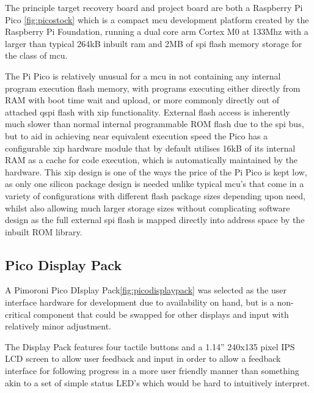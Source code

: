 The principle target recovery board and project board are both a Raspberry Pi Pico \autoref{fig:picostock} which is a compact \gls{mcu} development platform created by the Raspberry Pi Foundation, running a dual core \gls{arm} Cortex M0 at 133Mhz with a larger than typical 264kB inbuilt \gls{ram} and 2MB of \gls{spi} flash memory storage for the class of \gls{mcu}\cite{ltdBuyRaspberryPi}.

The Pi Pico is relatively unusual for a \gls{mcu} in not containing any internal program execution flash memory, with programs executing either directly from RAM with boot time wait and upload, or more commonly directly out of attached \gls{qspi} flash with \gls{xip} functionality. External flash access is inherently much slower than normal internal programmable ROM flash due to the \gls{spi} bus, but to aid in achieving near equivalent execution speed the Pico has a configurable \gls{xip} hardware module that by default utilises 16kB of its internal RAM as a cache for code execution, which is automatically maintained by the hardware. This \gls{xip} design is one of the ways the price of the Pi Pico is kept low, as only one silicon package design is needed unlike typical \gls{mcu}'s that come in a variety of configurations with different flash package sizes depending upon need, whilst also allowing much larger storage sizes without complicating software design as the full external \gls{spi} flash is mapped directly into address space by the inbuilt ROM library.



\clearpage
\subsection{Pico Display Pack}
A Pimoroni Pico DIsplay Pack\autoref{fig:picodisplaypack} was selected as the user interface hardware for development due to availability on hand, but is a non-critical component that could be swapped for other displays and input with relatively minor adjustment.

The Display Pack features four tactile buttons and a 1.14” 240x135 pixel IPS LCD screen to allow user feedback and input in order to allow a feedback interface for following progress in a more user friendly manner than something akin to a set of simple status LED's which would be hard to intuitively interpret.

